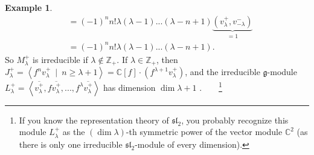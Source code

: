\documentclass
[numbers=enddot,12pt,final,onecolumn,german,notitlepage]{scrartcl}%
\theoremstyle{definition}
\newtheorem{example}[theo]{Example}
\begin{document}
\begin{example}
\begin{align*}
&  =\left(  -1\right)  ^{n}n!\lambda\left(  \lambda-1\right)  ...\left(
\lambda-n+1\right)  \underbrace{\left(  v_{\lambda}^{+},v_{-\lambda}%
^{-}\right)  }_{=1}\\
&  =\left(  -1\right)  ^{n}n!\lambda\left(  \lambda-1\right)  ...\left(
\lambda-n+1\right)  .
\end{align*}
So $M_{\lambda}^{+}$ is irreducible if $\lambda\notin\mathbb{Z}_{+}$. If
$\lambda\in\mathbb{Z}_{+}$, then $J_{\lambda}^{+}=\left\langle f^{n}%
v_{\lambda}^{+}\ \mid\ n\geq\lambda+1\right\rangle =\mathbb{C}\left[
f\right]  \cdot\left(  f^{\lambda+1}v_{\lambda}^{+}\right)  $, and the
irreducible $\mathfrak{g}$-module $L_{\lambda}^{+}=\left\langle \overline
{v_{\lambda}^{+}},f\overline{v_{\lambda}^{+}},...,f^{\lambda}\overline
{v_{\lambda}^{+}}\right\rangle $ has dimension $\dim\lambda+1$%
.\ \ \ \ \footnote{If you know the representation theory of $\mathfrak{sl}%
_{2}$, you probably recognize this module $L_{\lambda}^{+}$ as the $\left(
\dim\lambda\right)  $-th symmetric power of the vector module $\mathbb{C}^{2}$
(as there is only one irreducible $\mathfrak{sl}_{2}$-module of every
dimension).}
\end{example}
\end{document}
